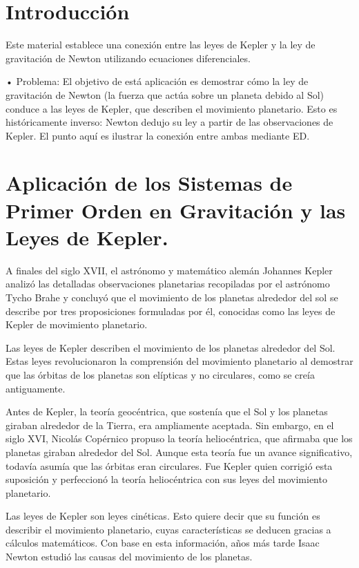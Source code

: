\documentclass{article}
\begin{document}
	\clearpage
	\tableofcontents  
	
	\clearpage
	
	\section{Introducción}
	Este material establece una conexión entre las leyes de Kepler y la ley de gravitación de Newton utilizando ecuaciones diferenciales. 

	• Problema: El objetivo de está aplicación es demostrar cómo la ley de gravitación de Newton (la fuerza que actúa sobre un planeta debido al Sol) conduce a las leyes de Kepler, que describen el movimiento planetario. Esto es históricamente inverso: Newton dedujo su ley a partir de las observaciones de Kepler. El punto aquí es ilustrar la conexión entre ambas mediante ED.

	\clearpage
	
	\section{Aplicación de los Sistemas de Primer Orden en Gravitación y las Leyes de Kepler.}
	
	A finales del siglo XVII, el astrónomo y matemático alemán Johannes Kepler analizó las detalladas observaciones planetarias recopiladas por el astrónomo Tycho Brahe y concluyó que el movimiento de los planetas alrededor del sol se describe por tres proposiciones formuladas por él, conocidas como las leyes de Kepler de movimiento planetario. 
	
	Las leyes de Kepler describen el movimiento de los planetas alrededor del Sol. Estas leyes revolucionaron la comprensión del movimiento planetario al demostrar que las órbitas de los planetas son elípticas y no circulares, como se creía antiguamente.
	
	Antes de Kepler, la teoría geocéntrica, que sostenía que el Sol y los planetas giraban alrededor de la Tierra, era ampliamente aceptada. Sin embargo, en el siglo XVI, Nicolás Copérnico propuso la teoría heliocéntrica, que afirmaba que los planetas giraban alrededor del Sol. Aunque esta teoría fue un avance significativo, todavía asumía que las órbitas eran circulares. Fue Kepler quien corrigió esta suposición y perfeccionó la teoría heliocéntrica con sus leyes del movimiento planetario.
	
	Las leyes de Kepler son leyes cinéticas. Esto quiere decir que su función es describir el movimiento planetario, cuyas características se deducen gracias a cálculos matemáticos. Con base en esta información, años más tarde Isaac Newton estudió las causas del movimiento de los planetas.
	
\end{document}
